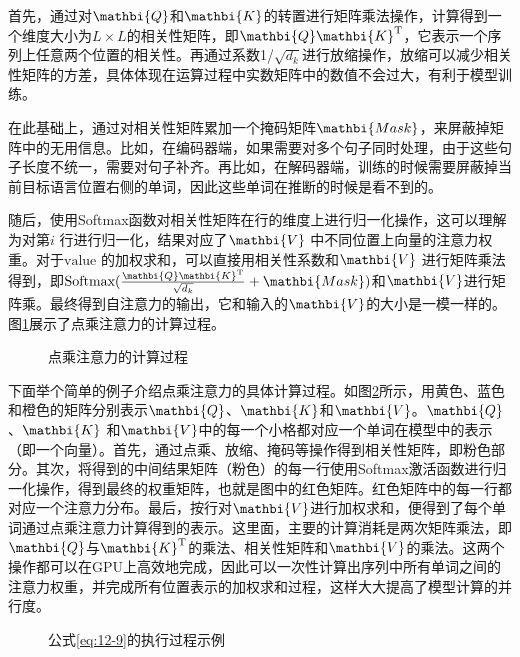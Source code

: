 \noindent 首先，通过对$\mathbi{Q}$和$\mathbi{K}$的转置进行矩阵乘法操作，计算得到一个维度大小为$L \times L$的相关性矩阵，即$\mathbi{Q}\mathbi{K}^{\textrm{T}}$，它表示一个序列上任意两个位置的相关性。再通过系数1/$\sqrt{d_k}$进行放缩操作，放缩可以减少相关性矩阵的方差，具体体现在运算过程中实数矩阵中的数值不会过大，有利于模型训练。

\parinterval 在此基础上，通过对相关性矩阵累加一个掩码矩阵$\mathbi{Mask}$，来屏蔽掉矩阵中的无用信息。比如，在编码器端，如果需要对多个句子同时处理，由于这些句子长度不统一，需要对句子补齐。再比如，在解码器端，训练的时候需要屏蔽掉当前目标语言位置右侧的单词，因此这些单词在推断的时候是看不到的。

\parinterval 随后，使用Softmax函数对相关性矩阵在行的维度上进行归一化操作，这可以理解为对第$i$ 行进行归一化，结果对应了$\mathbi{V}$ 中不同位置上向量的注意力权重。对于$\mathrm{value}$ 的加权求和，可以直接用相关性系数和$\mathbi{V}$ 进行矩阵乘法得到，即$\textrm{Softmax}
 ( \frac{\mathbi{Q}\mathbi{K}^{\textrm{T}}} {\sqrt{d_k}} + \mathbi{Mask} )$和$\mathbi{V}$进行矩阵乘。最终得到自注意力的输出，它和输入的$\mathbi{V}$的大小是一模一样的。图\ref{fig:12-10}展示了点乘注意力的计算过程。

\begin{figure}[htp]
\centering

\caption{点乘注意力的计算过程}
\label{fig:12-10}
\end{figure}

\parinterval 下面举个简单的例子介绍点乘注意力的具体计算过程。如图\ref{fig:12-11}所示，用黄色、蓝色和橙色的矩阵分别表示$\mathbi{Q}$、$\mathbi{K}$和$\mathbi{V}$。$\mathbi{Q}$、$\mathbi{K}$ 和$\mathbi{V}$中的每一个小格都对应一个单词在模型中的表示（即一个向量）。首先，通过点乘、放缩、掩码等操作得到相关性矩阵，即粉色部分。其次，将得到的中间结果矩阵（粉色）的每一行使用Softmax激活函数进行归一化操作，得到最终的权重矩阵，也就是图中的红色矩阵。红色矩阵中的每一行都对应一个注意力分布。最后，按行对$\mathbi{V}$进行加权求和，便得到了每个单词通过点乘注意力计算得到的表示。这里面，主要的计算消耗是两次矩阵乘法，即$\mathbi{Q}$与$\mathbi{K}^{\textrm{T}}$的乘法、相关性矩阵和$\mathbi{V}$的乘法。这两个操作都可以在GPU上高效地完成，因此可以一次性计算出序列中所有单词之间的注意力权重，并完成所有位置表示的加权求和过程，这样大大提高了模型计算的并行度。

\begin{figure}[htp]
\centering

\caption{公式\eqref{eq:12-9}的执行过程示例}
\label{fig:12-11}
\end{figure}


